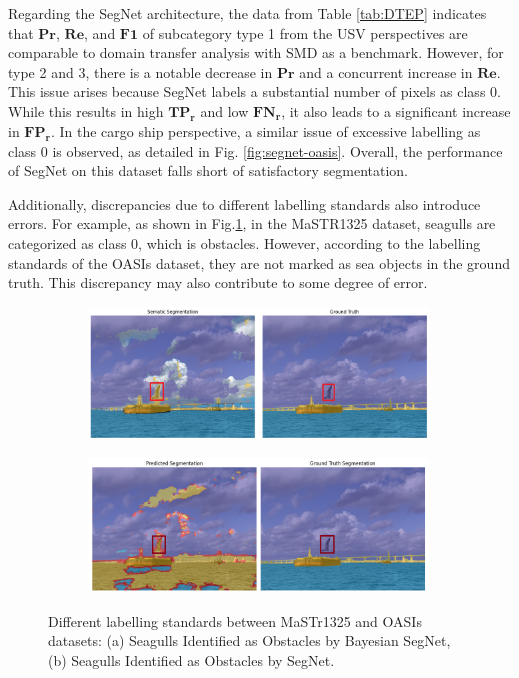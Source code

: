 Regarding the SegNet architecture, the data from Table \ref{tab:DTEP} indicates that $\mathbf{Pr}$,  $\mathbf{Re}$, 
and  $\mathbf{F1}$ of subcategory type 1 from the USV perspectives are comparable to domain transfer analysis with 
SMD as a benchmark. However, for type 2 and 3, there is a notable decrease in $\mathbf{Pr}$ and a concurrent increase 
in $\mathbf{Re}$. This issue arises because SegNet labels a substantial number of pixels as class 0. While this 
results in high $\mathbf{TP_r}$ and low $\mathbf{FN_r}$, it also leads to a significant increase in $\mathbf{FP_r}$. 
In the cargo ship perspective, a similar issue of excessive labelling as class 0 is observed, as detailed in Fig.
\ref{fig:segnet-oasis}. Overall, the performance of SegNet on this dataset falls short of satisfactory segmentation.

Additionally, discrepancies due to different labelling standards also introduce errors. For example, as shown in 
Fig.\ref{fig:seagull}, in the MaSTR1325 dataset, seagulls are categorized as class 0, which is obstacles. However, 
according to the labelling standards of the OASIs dataset, they are not marked as sea objects in the ground truth. 
This discrepancy may also contribute to some degree of error. 
\begin{figure}[ht!]
    \centering
    \begin{subfigure}[h]{0.45\textwidth} \centering
        \includegraphics[width=0.99\textwidth]{figures/OASIs/BayesianSegNet-seagull.png}
        \caption{}
    \end{subfigure} \hspace{-1mm}
    \begin{subfigure}[h]{0.45\textwidth} \centering
        \includegraphics[width=0.99\textwidth]{figures/OASIs/SegNet-seagull.png}
        \caption{}
    \end{subfigure}
    \caption{Different labelling standards between MaSTr1325 and OASIs datasets: 
    (a) Seagulls Identified as Obstacles by Bayesian SegNet, (b) Seagulls Identified as Obstacles by SegNet.}
    \label{fig:seagull}
\end{figure}

